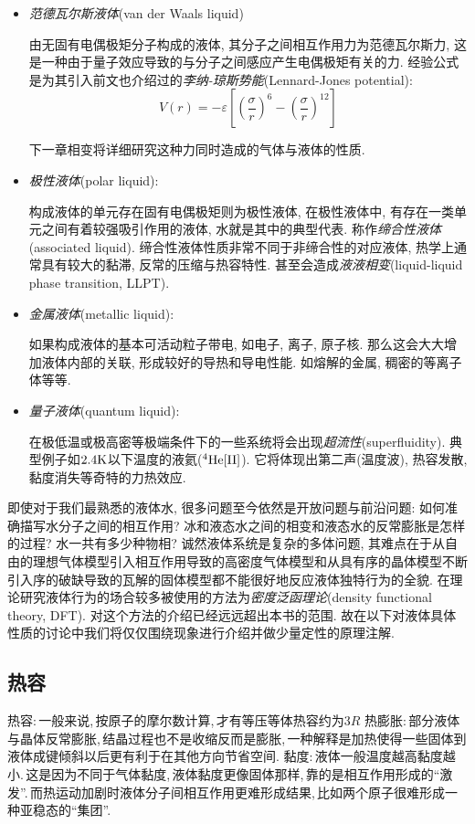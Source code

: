\begin{itemize}
\item \emph{范德瓦尔斯液体}(van der Waals liquid)

由无固有电偶极矩分子构成的液体, 其分子之间相互作用力为范德瓦尔斯力, 这是一种由于量子效应导致的与分子之间感应产生电偶极矩有关的力. 经验公式是为其引入前文也介绍过的\emph{李纳-琼斯势能}(Lennard-Jones potential):
\[V(r)=-\varepsilon  \left[ \left( \frac{\sigma}{r} \right)^6- \left( \frac{\sigma}{r} \right)^{12}\right]  \]

下一章相变将详细研究这种力同时造成的气体与液体的性质.

\item \emph{极性液体}(polar liquid):

构成液体的单元存在固有电偶极矩则为极性液体, 在极性液体中, 有存在一类单元之间有着较强吸引作用的液体, 水就是其中的典型代表. 称作\emph{缔合性液体}(associated liquid). 缔合性液体性质非常不同于非缔合性的对应液体, 热学上通常具有较大的黏滞, 反常的压缩与热容特性. 甚至会造成\emph{液液相变}(liquid-liquid phase transition, LLPT).

\item \emph{金属液体}(metallic liquid):

如果构成液体的基本可活动粒子带电, 如电子, 离子, 原子核. 那么这会大大增加液体内部的关联, 形成较好的导热和导电性能. 如熔解的金属, 稠密的等离子体等等.

\item \emph{量子液体}(quantum liquid):

在极低温或极高密等极端条件下的一些系统将会出现\emph{超流性}(superfluidity). 典型例子如$2.4{\rm K}$以下温度的液氦(${\rm {}^4He[II]}$). 它将体现出第二声(温度波), 热容发散, 黏度消失等奇特的力热效应.

\end{itemize}

即使对于我们最熟悉的液体水, 很多问题至今依然是开放问题与前沿问题: 如何准确描写水分子之间的相互作用? 冰和液态水之间的相变和液态水的反常膨胀是怎样的过程? 水一共有多少种物相? 诚然液体系统是复杂的多体问题, 其难点在于从自由的理想气体模型引入相互作用导致的高密度气体模型和从具有序的晶体模型不断引入序的破缺导致的瓦解的固体模型都不能很好地反应液体独特行为的全貌. 在理论研究液体行为的场合较多被使用的方法为\emph{密度泛函理论}(density functional theory, DFT). 对这个方法的介绍已经远远超出本书的范围. 故在以下对液体具体性质的讨论中我们将仅仅围绕现象进行介绍并做少量定性的原理注解.


\subsection{热容}
热容:\,一般来说,\,按原子的摩尔数计算,\,才有等压等体热容约为$3R$
热膨胀:\,部分液体与晶体反常膨胀,\,结晶过程也不是收缩反而是膨胀,\,一种解释是加热使得一些固体到液体成键倾斜以后更有利于在其他方向节省空间.
黏度:\,液体一般温度越高黏度越小.\,这是因为不同于气体黏度,\,液体黏度更像固体那样,\,靠的是相互作用形成的``激发''.\,而热运动加剧时液体分子间相互作用更难形成结果,\,比如两个原子很难形成一种亚稳态的``集团''.





